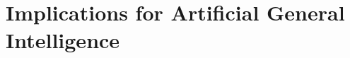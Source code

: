 \documentclass[runningheads]{llncs}
\begin{document}

\section{Implications for Artificial General Intelligence}



\end{document}
